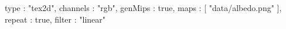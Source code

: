 {
	type : "tex2d",
	channels : "rgb",
	genMips : true,
	maps : [
		"data/albedo.png"
	],
	repeat : true,
	filter : "linear"
}